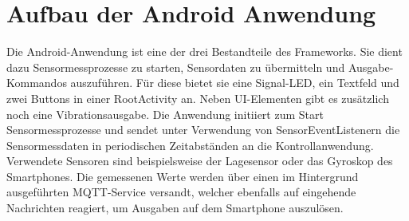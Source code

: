 \documentclass[11pt,a4paper]{report}
\begin{document}
\chapter{Aufbau der Android Anwendung}\label{chap:app}
Die Android-Anwendung ist eine der drei Bestandteile des Frameworks.
Sie dient dazu Sensormessprozesse zu starten, Sensordaten zu übermitteln und Ausgabe-Kommandos auszuführen.
Für diese bietet sie eine Signal-LED, ein Textfeld und zwei Buttons in einer RootActivity an.
Neben UI-Elementen gibt es zusätzlich noch eine Vibrationsausgabe. 
Die Anwendung initiiert zum Start Sensormessprozesse und sendet unter Verwendung von SensorEventListenern die Sensormessdaten in periodischen Zeitabständen an die Kontrollanwendung.
Verwendete Sensoren sind beispielsweise der Lagesensor oder das Gyroskop des Smartphones.
Die gemessenen Werte werden über einen im Hintergrund ausgeführten MQTT-Service versandt, welcher ebenfalls auf eingehende Nachrichten reagiert, um Ausgaben auf dem Smartphone auszulösen.
\end{document}
